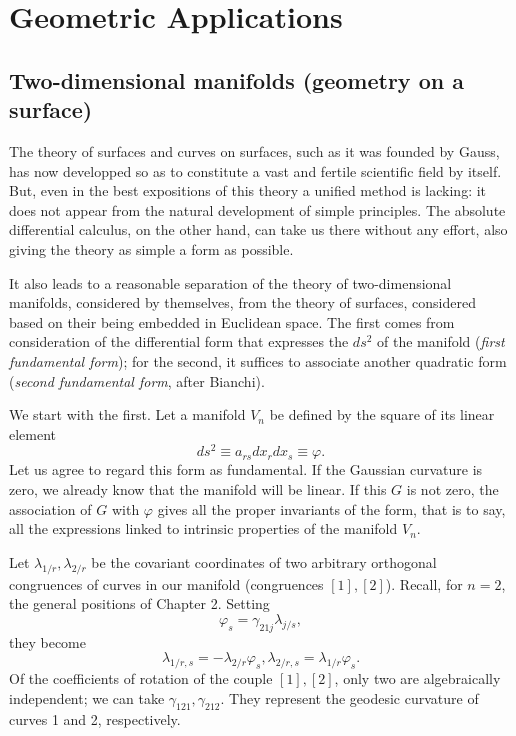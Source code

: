\documentclass{book}
\begin{document}
\chapter{Geometric Applications}
\section{Two-dimensional manifolds (geometry on a surface)}
The theory of surfaces and curves on surfaces, such as it was founded by Gauss, has now developped so as to constitute a vast and fertile scientific field by itself. But, even in the best expositions of this theory a unified method is lacking: it does not appear from the natural development of simple principles. The absolute differential calculus, on the other hand, can take us there without any effort, also giving the theory as simple a form as possible. 

It also leads to a reasonable separation of the theory of two-dimensional manifolds, considered by themselves, from the theory of surfaces, considered based on their being embedded in Euclidean space. The first comes from consideration of the differential form that expresses the $ds^2$ of the manifold (\emph{first fundamental form}); for the second, it suffices to associate another quadratic form (\emph{second fundamental form}, after Bianchi). 

We start with the first. Let a manifold $V_n$ be defined by the square of its linear element
$$ds^2\equiv a_{rs}dx_rdx_s\equiv\varphi.$$
Let us agree to regard this form as fundamental. If the Gaussian curvature is zero, we already know that the manifold will be linear. If this $G$ is not zero, the association of $G$ with $\varphi$ gives all the proper invariants of the form, that is to say, all the expressions linked to intrinsic properties of the manifold $V_n$. 

Let $\lambda_{1/r},\lambda_{2/r}$ be the covariant coordinates of two arbitrary orthogonal congruences of curves in our manifold (congruences $[1],[2]$). Recall, for $n=2$, the general positions of Chapter 2. Setting
\begin{equation}
\varphi_s=\gamma_{21j}\lambda_{j/s},
\end{equation}
they become
\begin{equation}
\lambda_{1/r,s}=-\lambda_{2/r}\varphi_s, \lambda_{2/r,s}=\lambda_{1/r}\varphi_s.
\end{equation}
Of the coefficients of rotation of the couple $[1],[2]$, only two are algebraically independent; we can take $\gamma_{121},\gamma_{212}$. They represent the geodesic curvature of curves 1 and 2, respectively.
\end{document}
